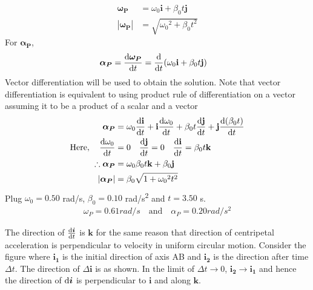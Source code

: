 \begin{enumerate}
\begin{align*}
\bm{\omega_P} &= \omega_0\mathbf{i} + \beta_0t\mathbf{j}\\
|\bm{\omega_P}|&= \sqrt{{\omega_0}^2+{\beta_0t}^2}
\end{align*}
For $\bm{\alpha_P}$,
\begin{align*}
\bm{\alpha_P}&=\frac{\displaystyle \mathop{}\!\mathrm{d} \bm{\omega_P}}{\displaystyle \mathop{}\!\mathrm{d} t}=\frac{\mathop{}\!\mathrm{d}}{\mathop{}\!\mathrm{d} t}(\omega_0\mathbf{i} + \beta_0t\mathbf{j})
\end{align*}
Vector differentiation will be used to obtain the solution. Note that vector differentiation is equivalent to using product rule of differentiation on a vector assuming it to be a product of a scalar and a vector
\begin{align*}
\bm{\alpha_P}&=\omega_0\frac{\diff \mathbf{i}}{\diff t} + \mathbf{i}\frac{\diff \omega_0}{\diff t} + \beta_0t\frac{\diff \mathbf{j}}{\diff t} + \mathbf{j}\frac{\diff (\beta_0t)}{\diff t}\\
\text{Here}, \quad \frac{\diff \omega_0}{\diff t} &= 0 \quad \frac{\diff \mathbf{j}}{\diff t}=0 \quad \frac{\diff \mathbf{i}}{\diff t} = \beta_0t \mathbf{k}\\
\therefore \bm{\alpha_P}&= \omega_0\beta_0t\mathbf{k}+\beta_0\mathbf{j}\\
|\bm{\alpha_P}|&= \beta_0\sqrt{1+{\omega_0}^2t^2}
\end{align*}
Plug $\omega_0=0.50$ rad/s, $\beta_0=0.10$ \si{rad/s^2} and $t=3.50$ s.
\begin{align*}
\omega_P=0.61 \si{ rad/s} \quad \text{and} \quad \alpha_P=0.20 \si{ rad/s^2}
\end{align*}

\begin{minipage}{0.6\textwidth}
    The direction of $\frac{\mathop{}\!\mathrm{d} \bm{i}}{\mathop{}\!\mathrm{d} t}$ is $\bm{k}$ for the same reason that direction of centripetal acceleration is perpendicular to velocity in uniform circular motion. Consider the figure where $\bm{i_1}$ is the initial direction of axis AB and $\bm{i_2}$ is the direction after time $\Delta t$. The direction of $\Delta \bm{i}$ is as shown. In the limit of $\Delta t \to 0$, $\bm{i_2} \to \bm{i_1}$ and hence the direction of $\mathop{}\!\mathrm{d} \bm{i}$ is perpendicular to $\bm{i}$ and along $\bm{k}$.
\end{minipage} \hspace{0.05\textwidth}
\begin{minipage}{0.25\textwidth}
    
\end{minipage}

\end{enumerate}


